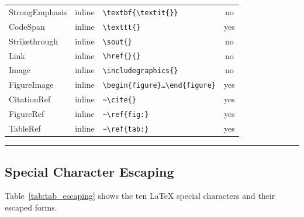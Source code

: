 \documentclass{article}
\begin{document}
\begin{table}[H]
\begin{tabular}{lclc}
StrongEmphasis & inline & \texttt{\textbackslash{}textbf\{\textbackslash{}textit\{\}\}} & no \\
CodeSpan & inline & \texttt{\textbackslash{}texttt\{\}} & yes \\
Strikethrough & inline & \texttt{\textbackslash{}sout\{\}} & no \\
Link & inline & \texttt{\textbackslash{}href\{\}\{\}} & no \\
Image & inline & \texttt{\textbackslash{}includegraphics\{\}} & no \\
FigureImage & inline & \texttt{\textbackslash{}begin\{figure\}…\textbackslash{}end\{figure\}} & yes \\
CitationRef & inline & \texttt{\textasciitilde{}\textbackslash{}cite\{\}} & yes \\
FigureRef & inline & \texttt{\textasciitilde{}\textbackslash{}ref\{fig:\}} & yes \\
TableRef & inline & \texttt{\textasciitilde{}\textbackslash{}ref\{tab:\}} & yes \\
\bottomrule
\end{tabular}
\label{tab:my\_table}
\end{table}


\noindent\rule{\linewidth}{0.4pt}

\subsection{Special Character Escaping}

Table~\ref{tab:tab_escaping} shows the ten LaTeX special characters and their escaped forms.
\end{document}
